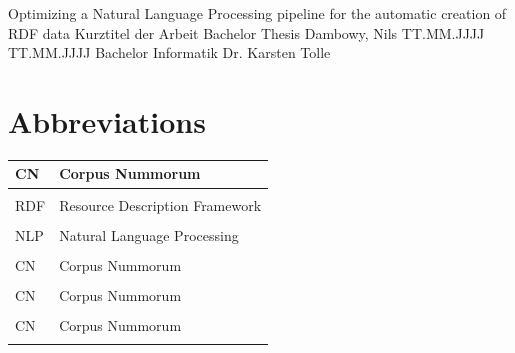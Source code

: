 \documentclass[12pt, oneside]{article}
\begin{document}
\DeclareRobustCommand{\hlcyan}[1]{{\sethlcolor{cyan}\hl{#1}}}
\DeclareRobustCommand{\hlgreen}[1]{{\sethlcolor{green}\hl{#1}}}
\DeclareRobustCommand{\hlred}[1]{{\sethlcolor{red}\hl{#1}}}



\titlespacing{\section}{0pt}{0pt}{0pt}
\titlespacing{\subsection}{0pt}{6pt}{0pt}
\titlespacing{\subsubsection}{0pt}{6pt}{0pt}

  \JMUTitle
      {Optimizing a Natural Language Processing pipeline for the automatic creation of RDF data}                                %
      {Kurztitel der Arbeit}                            %
      {Bachelor Thesis}       %
      {Dambowy, Nils }                              %
      {TT.MM.JJJJ}                                      %
      {TT.MM.JJJJ}                                      %
      {Bachelor Informatik}           %
      {Dr. Karsten Tolle}
      { }                                                              %
\newpage
{}




\tableofcontents


\newpage
{}
\setcounter{page}{1}
  
  


\newpage
\section*{Abbreviations} \label{abv}
\begin{center}
\begin{tabular}{p{6cm}|p{6cm}}
CN & Corpus Nummorum\\
\hline\\
RDF & Resource Description Framework\\
\hline\\
NLP & Natural Language Processing\\
\hline\\
CN & Corpus Nummorum\\
\hline\\
CN & Corpus Nummorum\\
\hline\\
CN & Corpus Nummorum\\
\hline\\
\end{tabular}
\end{center}
\newpage
\end{document}
